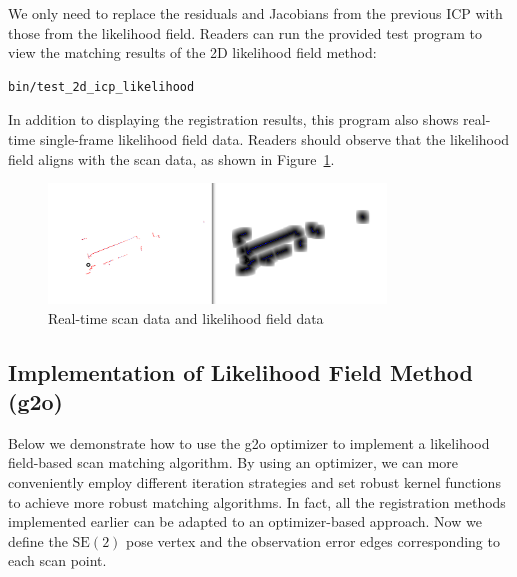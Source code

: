 We only need to replace the residuals and Jacobians from the previous ICP with those from the likelihood field. Readers can run the provided test program to view the matching results of the 2D likelihood field method:  

\begin{lstlisting}[language=sh,caption=Terminal input:]  
	bin/test_2d_icp_likelihood   
\end{lstlisting}  

In addition to displaying the registration results, this program also shows real-time single-frame likelihood field data. Readers should observe that the likelihood field aligns with the scan data, as shown in Figure~\ref{fig:scan-and-field}.  

\begin{figure}[!htp]  
	\centering  
	\includegraphics[width=0.8\textwidth]{resources/2d-lidar-mapping/ch6-scan-and-filed.png}  
	\caption{Real-time scan data and likelihood field data}  
	\label{fig:scan-and-field}  
\end{figure}

\subsection{Implementation of Likelihood Field Method (g2o)}
Below we demonstrate how to use the g2o optimizer \cite{Kummerle2011} to implement a likelihood field-based scan matching algorithm. By using an optimizer, we can more conveniently employ different iteration strategies and set robust kernel functions to achieve more robust matching algorithms. In fact, all the registration methods implemented earlier can be adapted to an optimizer-based approach. Now we define the $\mathrm{SE}(2)$ pose vertex and the observation error edges corresponding to each scan point.

